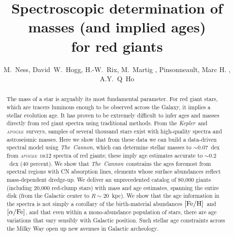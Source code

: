\documentclass[12pt, preprint]{aastex}
\newcommand{\project}[1]{\textsl{#1}}
\newcommand{\tc}{\project{The~Cannon}}
\newcommand{\apogee}{\project{\textsc{apogee}}}
\newcommand{\kepler}{\project{Kepler}}
\newcommand{\feh}{\mbox{$\rm [Fe/H]$}}
\newcommand{\alphafe}{\mbox{$\rm [\alpha/Fe]$}}
\begin{document}
\title{Spectroscopic determination of masses (and implied ages) \\for red giants}
\author{M.~Ness,
        David~W.~Hogg,
        H.-W.~Rix,
        M.~Martig , 
       Pinsonneault, Marc H. ,
        A.Y.~Q~Ho }

\begin{abstract}%
The mass of a star is arguably its most fundamental parameter.
For red giant stars, which are tracers luminous enough to be observed
across the Galaxy, it implies a stellar evolution age.
It has proven to be extremely difficult to infer ages and masses directly from red giant spectra using traditional methods.
From the \kepler\ and \apogee\ surveys, samples of several thousand
stars exist with high-quality spectra and astroseismic masses.
Here we show that from these data we can build a data-driven spectral
model using \tc, which can determine stellar masses to $\sim 0.07$~dex
from \apogee\ \textsc{dr12} spectra of red giants; these imply age
estimates accurate to $\sim 0.2$~dex (40 percent).
We show that \tc\ constrains the ages foremost from spectral regions
with CN absorption lines, elements whose surface abundances reflect
mass-dependent dredge-up.
We deliver an unprecedented catalog of 80,000 giants (including 20,000
red-clump stars) with mass and age estimates, spanning the entire disk
(from the Galactic center to $R\sim 20$~kpc).
We show that the age information in the spectra is not simply a
corollary of the birth-material abundances \feh\ and \alphafe, and
that even within a mono-abundance population of stars, there are age
variations that vary sensibly with Galactic position.
Such stellar age constraints across the Milky Way open up new avenues
in Galactic archeology.
\end{abstract}
\end{document}
